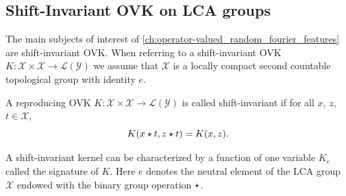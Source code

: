 \subsection{Shift-Invariant \acs{OVK} on \acs{LCA}
groups}
The main subjects of interest of
\cref{ch:operator-valued_random_fourier_features} are shift-invariant
\acl{OVK}. When referring to a shift-invariant \ac{OVK}
$K:\mathcal{X}\times\mathcal{X}\to\mathcal{L}(\mathcal{Y})$ we assume that
$\mathcal{X}$ is a locally compact second countable topological group with
identity
$e$.
\begin{definition}
    A reproducing \acl{OVK}
    $K:\mathcal{X}\times\mathcal{X}\to\mathcal{L}(\mathcal{Y})$ is called
    shift-invariant if for all $x$, $z$, $t\in\mathcal{X}$,
    \begin{dmath}
        \label{eq:def_shift_inv}
        K(x\groupop t, z\groupop t) = K(x, z).
    \end{dmath}
\end{definition}
A shift-invariant kernel can be characterized by a function of one variable
$K_e$ called the signature of $K$. Here $e$ denotes the neutral element of the
\ac{LCA} group $\mathcal{X}$ endowed with the binary group operation
$\star$.
